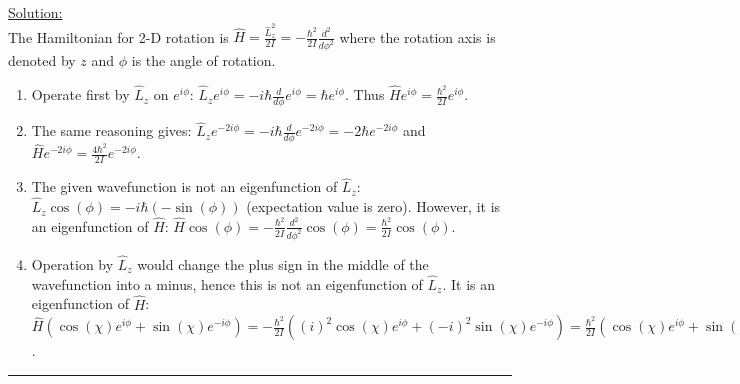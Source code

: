 \noindent
\underline{Solution:}\\

The Hamiltonian for 2-D rotation is $\hat{H} = \frac{\hat{L}_z^2}{2I} = -\frac{\hbar^2}{2I}\frac{d^2}{d\phi^2}$ where the rotation axis is denoted by $z$ and $\phi$ is the angle of rotation.

\begin{enumerate}
\item Operate first by $\hat{L}_z$ on $e^{i\phi}$: $\hat{L}_ze^{i\phi} = -i\hbar\frac{d}{d\phi}e^{i\phi} = \hbar e^{i\phi}$. Thus $\hat{H}e^{i\phi} = \frac{\hbar^2}{2I}e^{i\phi}$.
\item The same reasoning gives: $\hat{L}_z e^{-2i\phi} = -i\hbar\frac{d}{d\phi}e^{-2i\phi} = -2\hbar e^{-2i\phi}$ and $\hat{H}e^{-2i\phi} = \frac{4\hbar^2}{2I}e^{-2i\phi}$.
\item The given wavefunction is not an eigenfunction of $\hat{L}_z$: $\hat{L}_z\cos(\phi) = -i\hbar\left(-\sin(\phi)\right)$ (expectation value is zero).
However, it is an eigenfunction of $\hat{H}$: $\hat{H}\cos(\phi) = -\frac{\hbar^2}{2I}\frac{d^2}{d\phi^2}\cos(\phi) = \frac{\hbar^2}{2I}\cos(\phi)$.
\item Operation by $\hat{L}_z$ would change the plus sign in the middle of the wavefunction into a minus, hence this is not an eigenfunction of $\hat{L}_z$. It is an eigenfunction of $\hat{H}$: $\hat{H}(\cos(\chi)e^{i\phi} + \sin(\chi)e^{-i\phi}) = -\frac{\hbar^2}{2I}\left((i)^2\cos(\chi)e^{i\phi} + (-i)^2\sin(\chi)e^{-i\phi}\right) = \frac{\hbar^2}{2I}\left(\cos(\chi)e^{i\phi} + \sin(\chi)e^{-i\phi}\right)$.
\end{enumerate}

\hrule\vspace{0.5cm}
